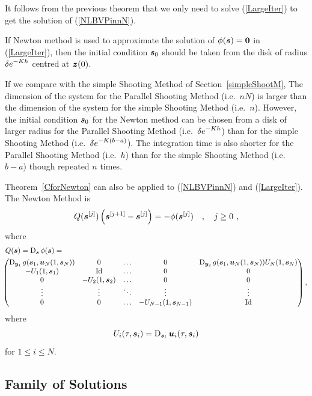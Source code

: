 It follows from the previous theorem that we only need to solve
(\ref{LargeIter}) to get the solution of (\ref{NLBVPinnN}).

If Newton method is used to approximate the solution
of $\phi(\bm{s}) = \bm{0}$ in (\ref{LargeIter}), then 
the initial condition $\bm{s}_0$ should be taken from
the disk of radius $\displaystyle \delta e^{-Kh}$ centred at $\bm{z}(0)$.

If we compare with the simple Shooting Method of
Section~\ref{simpleShootM},  The dimension of the system for the 
Parallel Shooting Method (i.e.\ $nN$) is larger than the dimension of
the system for the simple Shooting Method (i.e.\ $n$).  However,
the initial condition $\bm{s}_0$ for the Newton method can be chosen
from a disk of larger radius for the Parallel Shooting Method
(i.e.\ $\displaystyle \delta e^{-Kh}$) than for the simple Shooting Method
(i.e.\ $\displaystyle \delta e^{-K(b-a)}$).  The integration time is
also shorter for the Parallel Shooting Method (i.e.\ $h$) than for the simple
Shooting Method (i.e.\ $b-a$) though repeated $n$ times.

\begin{rmk}
Theorem~\ref{CforNewton} can also be applied to
(\ref{NLBVPinnN}) and (\ref{LargeIter}). The Newton Method is
\[
Q(\bm{s}^{[j]}) \left( \bm{s}^{[j+1]} - \bm{s}^{[j]} \right) =
-\phi(\bm{s}^{[j]}) \quad , \quad j \geq 0 \ ,
\]
where
\begin{align*}
&Q(\bm{s}) = \operatorname{D}_{\bm{s}} \phi(\bm{s}) = \\
&\hspace{-5pt} \begin{pmatrix}
\operatorname{D}_{\bm{y}_1}g(\bm{s}_1,\bm{u}_N(1,\bm{s}_N))
& 0 & \ldots & 0 &
\operatorname{D}_{\bm{y}_2}g(\bm{s}_1,\bm{u}_N(1,\bm{s}_N))U_N(1,\bm{s}_N) \\
-U_1(1,\bm{s}_1) & \operatorname{Id} &  \ldots & 0 & 0 \\
0 & -U_2(1,\bm{s}_2) &  \ldots & 0 & 0\\
\vdots & \vdots & \ddots & \vdots & \vdots \\
0 & 0 & \ldots & -U_{N-1}(1,\bm{s}_{N-1}) & \operatorname{Id} \\
\end{pmatrix},
\end{align*}
where
\[
  U_i(\tau,\bm{s}_i) = \operatorname{D}_{\bm{s}_i} \bm{u}_i(\tau,\bm{s}_i)
\]
for $1\leq i \leq N$.
\end{rmk}

\subsection{Family of Solutions}

